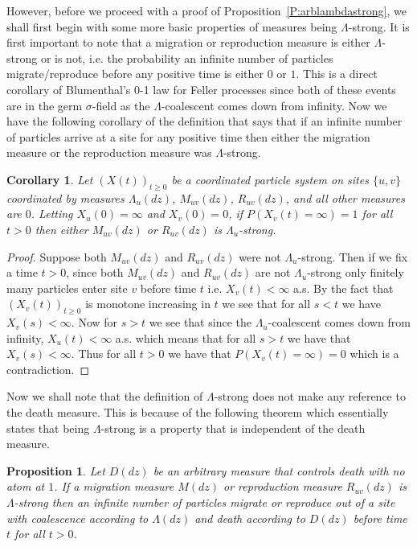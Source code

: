 \documentclass[11pt]{article}
\newtheorem{proposition}{Proposition}
\newtheorem{corollary}[lemma]{Corollary}
\theoremstyle{definition}
\newcommand{\propref}[1]{Proposition~\ref{P:#1}}
\begin{document}
\noindent However, before we proceed with a proof of \propref{arblambdastrong}, we shall first begin with some more basic properties of measures being $\Lambda$-strong. It is first important to note that a migration or reproduction measure is either $\Lambda$-strong or is not, i.e. the probability an infinite number of particles migrate/reproduce before any positive time is either $0$ or $1$. This is a direct corollary of Blumenthal's 0-1 law for Feller processes since both of these events are in the germ $\sigma$-field as the $\Lambda$-coalescent comes down from infinity. Now we have the following corollary of the definition that says that if an infinite number of particles arrive at a site for any positive time then either the migration measure or the reproduction measure was $\Lambda$-strong.

\begin{corollary}\label{C:eitherMorRstrong}
    Let $(X(t))_{t \geq 0}$ be a coordinated particle system on sites $\{u,v\}$ coordinated by measures $\Lambda_u(dz)$, $M_{uv}(dz)$, $R_{uv}(dz)$, and all other measures are $0$. Letting $X_u(0) = \infty$ and $X_v(0) = 0$, if $P(X_v(t) = \infty) = 1$ for all $t > 0$ then either $M_{uv}(dz)$ or $R_{uv}(dz)$ is $\Lambda_u$-strong.
\end{corollary}

\begin{proof}
    Suppose both $M_{uv}(dz)$ and $R_{uv}(dz)$ were not $\Lambda_u$-strong. Then if we fix a time $t > 0$, since both $M_{uv}(dz)$ and $R_{uv}(dz)$ are not $\Lambda_u$-strong only finitely many particles enter site $v$ before time $t$ i.e. $X_v(t) < \infty$ a.s. By the fact that $(X_v(t))_{t \geq 0}$ is monotone increasing in $t$ we see that for all $s < t$ we have $X_v(s) < \infty$. Now for $s > t$ we see that since the $\Lambda_u$-coalescent comes down from infinity, $X_u(t) < \infty$ a.s. which means that for all $s > t$ we have that $X_v(s) < \infty$. Thus for all $t > 0$ we have that $P(X_v(t) = \infty) = 0$ which is a contradiction.
\end{proof}

\noindent Now we shall note that the definition of $\Lambda$-strong does not make any reference to the death measure. This is because of the following theorem which essentially states that being $\Lambda$-strong is a property that is independent of the death measure.

\begin{proposition}\label{P:deathdoesntmatter}
    Let $D(dz)$ be an arbitrary measure that controls death with no atom at $1$. If a migration measure $M(dz)$ or reproduction measure $R_{uv}(dz)$ is $\Lambda$-strong then an infinite number of particles migrate or reproduce out of a site with coalescence according to $\Lambda(dz)$ and death according to $D(dz)$ before time $t$ for all $t > 0$.
\end{proposition}
\end{document}
